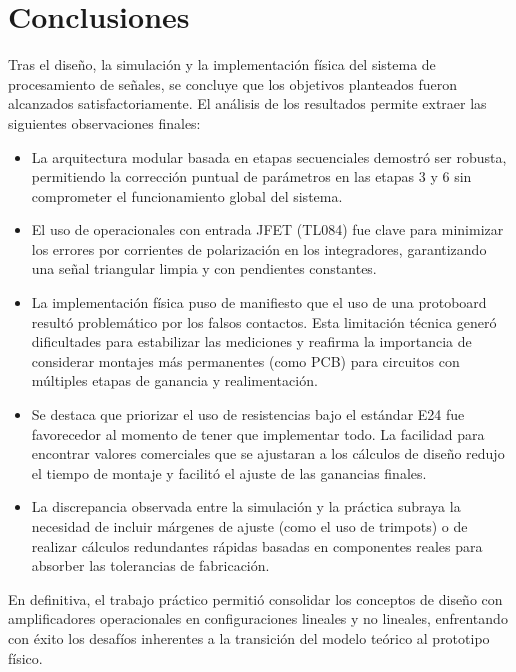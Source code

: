 \chapter{Conclusiones}
\label{chap:conclusiones}

Tras el diseño, la simulación y la implementación física del sistema de procesamiento de señales, se concluye que los
objetivos planteados fueron alcanzados satisfactoriamente. El análisis de los resultados permite extraer las siguientes
observaciones finales:

\begin{itemize}
    \item La arquitectura modular basada en etapas secuenciales demostró ser robusta, permitiendo la corrección puntual
    de parámetros en las etapas 3 y 6 sin comprometer el funcionamiento global del sistema.
    \item El uso de operacionales con entrada JFET (TL084) fue clave para minimizar los errores por corrientes de
    polarización en los integradores, garantizando una señal triangular limpia y con pendientes constantes.
    \item La implementación física puso de manifiesto que el uso de una protoboard resultó problemático por los falsos
    contactos. Esta limitación técnica generó dificultades para estabilizar las mediciones y reafirma la importancia de
    considerar montajes más permanentes (como PCB) para circuitos con múltiples etapas de ganancia y realimentación.
    \item Se destaca que priorizar el uso de resistencias bajo el estándar E24 fue favorecedor al momento de tener que
    implementar todo. La facilidad para encontrar valores comerciales que se ajustaran a los cálculos de diseño redujo
    el tiempo de montaje y facilitó el ajuste de las ganancias finales.
    \item La discrepancia observada entre la simulación y la práctica subraya la necesidad de incluir márgenes de ajuste
    (como el uso de trimpots) o de realizar cálculos redundantes rápidas basadas en componentes reales para absorber las
    tolerancias de fabricación.
\end{itemize}

En definitiva, el trabajo práctico permitió consolidar los conceptos de diseño con amplificadores operacionales en
configuraciones lineales y no lineales, enfrentando con éxito los desafíos inherentes a la transición del modelo teórico
al prototipo físico.
